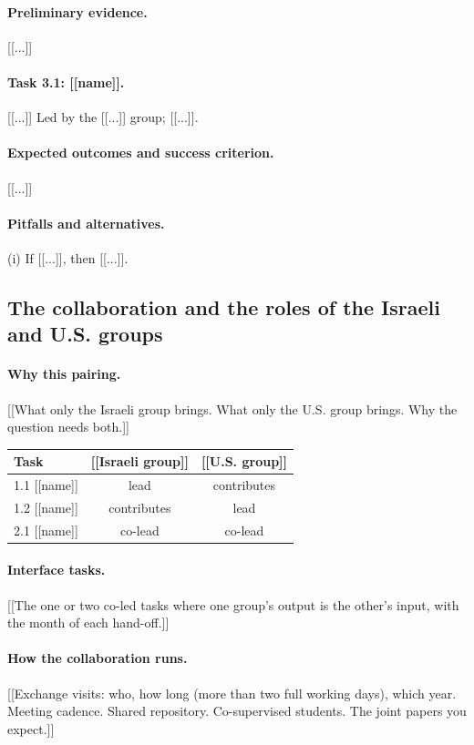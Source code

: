 \documentclass[12pt,a4paper]{article}
\begin{document}
\paragraph{Preliminary evidence.} [[...]]
\paragraph{Task 3.1: [[name]].} [[...]] Led by the [[...]] group; [[...]].
\paragraph{Expected outcomes and success criterion.} [[...]]
\paragraph{Pitfalls and alternatives.} (i) If [[...]], then [[...]].

\subsection{The collaboration and the roles of the Israeli and U.S. groups}

\paragraph{Why this pairing.} [[What only the Israeli group brings. What only the U.S. group
brings. Why the question needs both.]]

\begin{center}
\begin{tabularx}{\linewidth}{Xcc}
\toprule
Task & [[Israeli group]] & [[U.S. group]] \\
\midrule
1.1 [[name]] & lead & contributes \\
1.2 [[name]] & contributes & lead \\
2.1 [[name]] & co-lead & co-lead \\
\bottomrule
\end{tabularx}
\end{center}

\paragraph{Interface tasks.} [[The one or two co-led tasks where one group's output is the
other's input, with the month of each hand-off.]]

\paragraph{How the collaboration runs.} [[Exchange visits: who, how long (more than two full
working days), which year. Meeting cadence. Shared repository. Co-supervised students. The
joint papers you expect.]]
\end{document}
